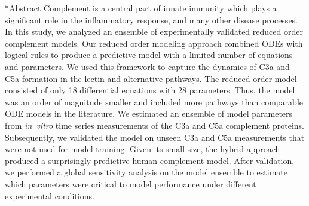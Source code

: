 \documentclass[12pt]{article}
\makeatletter
\renewcommand\section{\@startsection
	{subsection}{2}{0mm}
	{-0.2in}
	{0.05\baselineskip}
	{\normalfont\large\bfseries}}
\makeatother
\begin{document}
\section*{Abstract}
Complement is a central part of innate immunity which plays a significant role in the inflammatory response, and many other disease processes.
In this study, we analyzed an ensemble of experimentally validated reduced order complement models.
Our reduced order modeling approach combined ODEs with logical rules to produce a predictive model with a limited number of equations and parameters.
We used this framework to capture the dynamics of C3a and C5a formation in the lectin and alternative pathways.
The reduced order model consisted of only 18 differential equations with 28 parameters.
Thus, the model was an order of magnitude smaller and included more pathways than comparable ODE models in the literature.
We estimated an ensemble of model parameters from \textit{in~vitro} time series measurements of the C3a and C5a complement proteins.
Subsequently, we validated the model on unseen C3a and C5a measurements that were not used for model training.
Given its small size, the hybrid approach produced a surprisingly predictive human complement model.
After validation, we performed a global sensitivity analysis on the model ensemble to estimate which parameters were critical to model performance under different experimental conditions.



\end{document}
